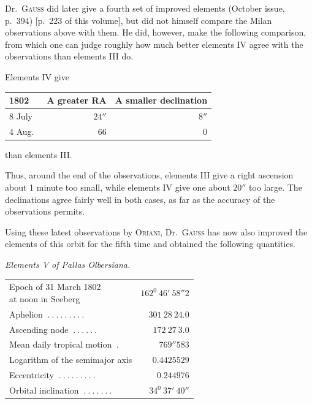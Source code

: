Dr.\ \textsc{Gauss} did later give a fourth set of improved elements (October issue, p.\ 394) [p.\ 223 of this volume], but did not himself compare the Milan observations above with them. He did, however, make the following comparison, from which one can judge roughly how much better elements IV agree with the observations than elements III do.
\begin{center}
Elements IV give\par\medskip
\begin{tabular}{l|r|r}
1802&A greater RA&A smaller declination\\\hline
8 July&$24''$&$8''$\\
4 Aug.\ &$66$&$0$
\end{tabular}\par\medskip
than elements III.
\end{center}

Thus, around the end of the observations, elements III give a right ascension about 1 minute too small, while elements IV give one about $20''$ too large. The declinations agree fairly well in both cases, as far as the accuracy of the observations permits.

Using these latest observations by \textsc{Oriani}, Dr.\ \textsc{Gauss} has now also improved the elements of this orbit for the fifth time and obtained the following quantities.
\begin{center}\textit{Elements V of Pallas Olbersiana.}\end{center}
\begin{center}
\begingroup\small\setlength{\tabcolsep}{3pt}
\begin{tabular}{l r}
\shortstack[l]{Epoch of 31 March 1802\\at noon in Seeberg}&$162^0\ 46'\ 58''2$\\
Aphelion $\ .\ .\ .\ .\ .\ .\ .\ .\ .$&$301\ 28\ 24.0$\\
Ascending node $\ .\ .\ .\ .\ .\ .$&$172\ 27\ 3.0$\\
Mean daily tropical motion $\ .$&$769''583$\\[3pt]
Logarithm of the semimajor axis&$0.4425529$\\
Eccentricity $\ .\ .\ .\ .\ .\ .\ .\ .\ .$&$0.244976$\\
Orbital inclination $\ .\ .\ .\ .\ .\ .\ .$&$34^0\ 37'\ 40''$
\end{tabular}\endgroup
\end{center}


